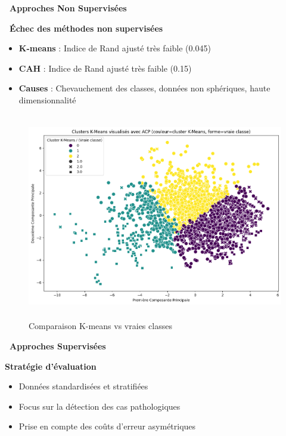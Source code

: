 \documentclass[a0,landscape]{a0poster}
\newcommand{\bigsection}[1]{
  \vspace{0.5cm}
  \begin{tcolorbox}[
    colback=primaryblue,
    coltext=white,
    arc=2mm,
    boxrule=0pt,
    left=10pt,
    right=10pt,
    top=5pt,
    bottom=5pt
  ]
    {\Large\bfseries #1\par}
  \end{tcolorbox}
  \vspace{0.3cm}
}
\newcommand{\checkitem}{\item[\textcolor{accentgreen}{\faCheck}]}
\begin{document}
\begin{multicols}{3}
\bigsection{\faCogs\ Approches Non Supervisées}

\begin{criticalbox}
\textbf{\faTimes\ Échec des méthodes non supervisées}
\begin{itemize}[leftmargin=1em]
  \item \textbf{K-means} : Indice de Rand ajusté très faible (0.045)
  \item \textbf{CAH} : Indice de Rand ajusté très faible (0.15)
  \item \textbf{Causes} : Chevauchement des classes, données non sphériques, haute dimensionnalité
\end{itemize}
\end{criticalbox}

\vspace{0.5cm}

\begin{figure}[H]
  \centering
  \includegraphics[width=0.85\linewidth,height=9cm,keepaspectratio]{kmeans_comparison.png}
  \caption{Comparaison K-means vs vraies classes}
  \label{fig:kmeans}
\end{figure}

\bigsection{\faRobot\ Approches Supervisées}

\textbf{\color{primaryblue} Stratégie d'évaluation}
\begin{itemize}
  \checkitem Données standardisées et stratifiées
  \checkitem Focus sur la détection des cas pathologiques
  \checkitem Prise en compte des coûts d'erreur asymétriques
\end{itemize}

\vspace{0.3cm}


\end{multicols}
\end{document}
